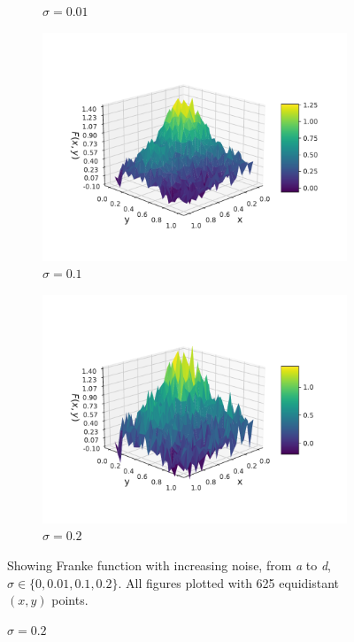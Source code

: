 \documentclass[twocolumn,english,notitlepage]{article}
\begin{document}
\begin{appendix}
\begin{figure}
\begin{subfigure}{.5\textwidth}
        \caption{$\sigma = 0.01$}
        \end{subfigure}
        \hfill
        \begin{subfigure}{.5\textwidth}
        \centering
        \includegraphics[width=\linewidth]{franke_functions_0_1.pdf}
        \caption{$\sigma = 0.1$}
        \end{subfigure}
        \begin{subfigure}{.5\textwidth}
        \centering
        \includegraphics[width=\linewidth]{franke_functions_0_2.pdf}
        \caption{$\sigma = 0.2$}
        \end{subfigure}


        \centerline{Showing Franke function with increasing noise, from \textit{a} to \textit{d}, $\sigma \in \{ 0, 0.01, 0.1, 0.2\}$. All figures plotted with 625 equidistant $(x,y)$ points.}
    \end{figure}


\end{appendix}

\printbibliography
\end{document}
